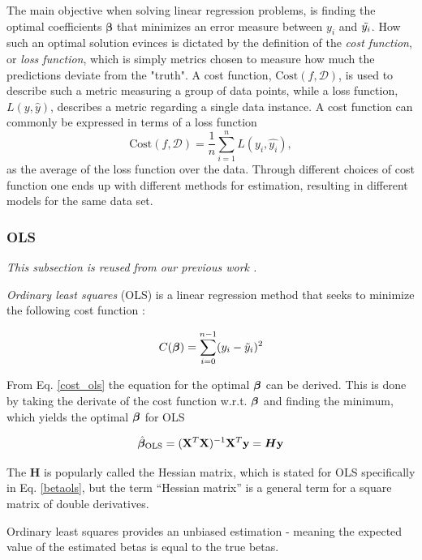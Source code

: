 The main objective when solving linear regression problems, is finding the optimal coefficients $\boldsymbol{\beta}$ that minimizes an error measure between $y_i$ and $\Tilde{y_i}$. 
How such an optimal solution evinces is dictated by the definition of the \textit{cost function},  or \textit{loss function}, which is simply metrics chosen to measure how much the predictions deviate from the "truth". 
A cost function, $\text{Cost}(f,\mathcal{D} )$, is used to describe such a metric measuring a group of data points, while a loss function, $L(y, \hat{y})$, describes a metric regarding a single data instance. 
A cost function can commonly be expressed in terms of a loss function
\begin{equation}
\text{Cost}(f,\mathcal{D}) = \frac{1}{n}\sum_{i=1}^n L(y_i, \hat{y_i}),
\end{equation}
as the average of the loss function over the data. 
Through different choices of cost function one ends up with different methods for estimation, resulting in different models for the same data set. 


\subsubsection{OLS}
\textit{This subsection is reused from our previous work \citep[p. 4]{project1}.}

\textit{Ordinary least squares} (OLS) is a linear regression method that seeks to minimize the following cost function \citep[Linear Regression]{morten}:

\begin{equation}\label{cost_ols}
    C(\boldsymbol{\beta}) = \sum_{i=0}^{n-1}(y_i-\Tilde{y}_i)^2
\end{equation}

From Eq. \ref{cost_ols} the equation for the optimal $\boldsymbol{\beta}$ can be derived. This is done by taking the derivate of the cost function w.r.t. $\boldsymbol{\beta}$ and finding the minimum, which yields the optimal $\boldsymbol{\beta}$ for OLS 

\begin{equation}\label{betaols}
    \hat{\boldsymbol{\beta}}_{\text{OLS}} = (\mathbf{X}^T\mathbf{X})^{-1}\mathbf{X}^T\mathbf{y} = \boldsymbol{H}\mathbf{y}
\end{equation}

The $\boldsymbol{H}$ is popularly called the Hessian matrix, which is stated for OLS specifically in Eq. \ref{betaols}, but the term ``Hessian matrix'' is a general term for a square matrix of double derivatives.

Ordinary least squares provides an unbiased estimation - meaning the expected value of the estimated betas is equal to the true betas.  

